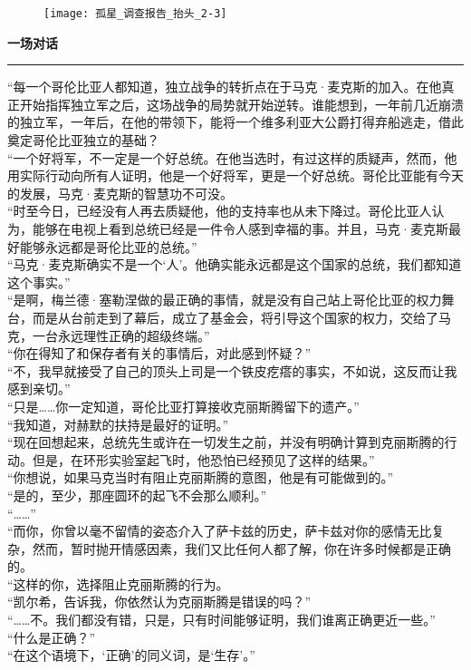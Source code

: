 \documentclass[openany]{book}
\begin{document}
\begin{figure}[h]
    \centering
    \texttt{[image: 孤星\_调查报告\_抬头\_2-3]}
\end{figure}
{\Large\textbf{一场对话}}\par\noindent\rule{\textwidth}{0.4pt}
“每一个哥伦比亚人都知道，独立战争的转折点在于马克·麦克斯的加入。在他真正开始指挥独立军之后，这场战争的局势就开始逆转。谁能想到，一年前几近崩溃的独立军，一年后，在他的带领下，能将一个维多利亚大公爵打得弃船逃走，借此奠定哥伦比亚独立的基础？\\
“一个好将军，不一定是一个好总统。在他当选时，有过这样的质疑声，然而，他用实际行动向所有人证明，他是一个好将军，更是一个好总统。哥伦比亚能有今天的发展，马克·麦克斯的智慧功不可没。\\
“时至今日，已经没有人再去质疑他，他的支持率也从未下降过。哥伦比亚人认为，能够在电视上看到总统已经是一件令人感到幸福的事。并且，马克·麦克斯最好能够永远都是哥伦比亚的总统。”\\
“马克·麦克斯确实不是一个‘人’。他确实能永远都是这个国家的总统，我们都知道这个事实。”\\
“是啊，梅兰德·塞勒涅做的最正确的事情，就是没有自己站上哥伦比亚的权力舞台，而是从台前走到了幕后，成立了基金会，将引导这个国家的权力，交给了马克，一台永远理性正确的超级终端。”\\
“你在得知了和保存者有关的事情后，对此感到怀疑？”\\
“不，我早就接受了自己的顶头上司是一个铁皮疙瘩的事实，不如说，这反而让我感到亲切。”\\
“只是……你一定知道，哥伦比亚打算接收克丽斯腾留下的遗产。”\\
“我知道，对赫默的扶持是最好的证明。”\\
“现在回想起来，总统先生或许在一切发生之前，并没有明确计算到克丽斯腾的行动。但是，在环形实验室起飞时，他恐怕已经预见了这样的结果。”\\
“你想说，如果马克当时有阻止克丽斯腾的意图，他是有可能做到的。”\\
“是的，至少，那座圆环的起飞不会那么顺利。”\\
“……”\\
“而你，你曾以毫不留情的姿态介入了萨卡兹的历史，萨卡兹对你的感情无比复杂，然而，暂时抛开情感因素，我们又比任何人都了解，你在许多时候都是正确的。\\
“这样的你，选择阻止克丽斯腾的行为。\\
“凯尔希，告诉我，你依然认为克丽斯腾是错误的吗？”\\
“……不。我们都没有错，只是，只有时间能够证明，我们谁离正确更近一些。”\\
“什么是正确？”\\
“在这个语境下，‘正确’的同义词，是‘生存’。”
\clearpage
\end{document}
